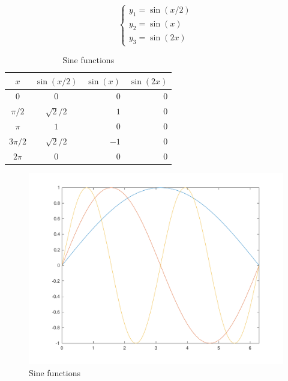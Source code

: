 \begin{equation}
  \label{eq:sine}
  \begin{cases}
    y_1 = \sin(x/2) \\
    y_2 = \sin(x)   \\
    y_3 = \sin(2x)
  \end{cases}
\end{equation}
\begin{table}[!hbtp]
\centering
\caption{Sine functions}
\label{tab:sine}
\begin{tabular}{ccrr}
\toprule
        $x$ & $\sin(x/2)$ &   $\sin(x)$ &  $\sin(2x)$ \\
\midrule
$0$      & $0$          & $0$  & $0$ \\
$\pi/2$  & $\sqrt{2}/2$ & $1$  & $0$ \\
$\pi$    & $1$          & $0$  & $0$ \\
$3\pi/2$ & $\sqrt{2}/2$ & $-1$ & $0$ \\
$2\pi$   & $0$          & $0$  & $0$ \\
\bottomrule
\end{tabular}
\end{table}
\begin{figure}[!hbtp]
  \centering
  \includegraphics[width=0.3\textheight]{./fig/sine.pdf}
  \caption{Sine functions}
  \label{fig:sine}
\end{figure}

